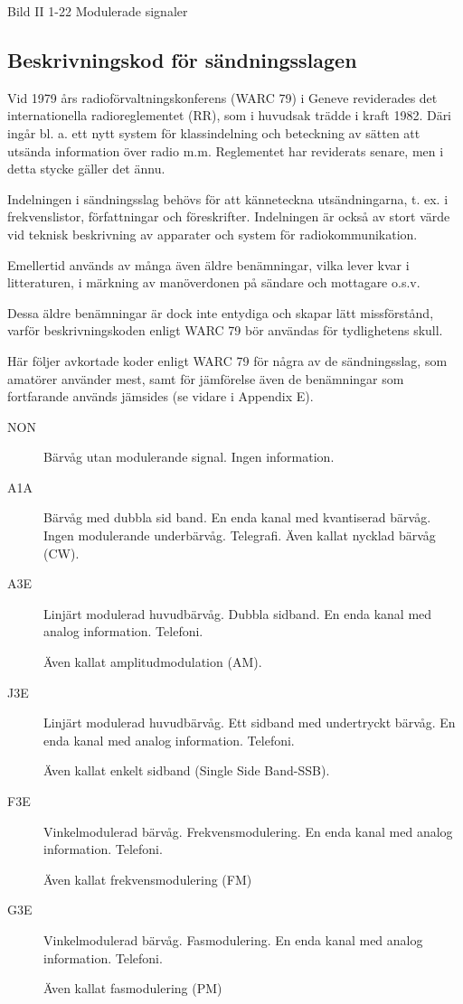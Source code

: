 Bild II 1-22 Modulerade signaler

\subsection{Beskrivningskod för sändningsslagen}

Vid 1979 års radioförvaltningskonferens (WARC 79) i Geneve reviderades det internationella
radioreglementet (RR), som i huvudsak trädde i kraft 1982. Däri ingår bl. a. ett nytt
system för klassindelning och beteckning av sätten att utsända information över
radio m.m. Reglementet har reviderats senare, men i detta stycke gäller det ännu.

Indelningen i sändningsslag behövs för att känneteckna utsändningarna, t. ex. i
frekvenslistor, författningar och föreskrifter. Indelningen är också av stort värde vid
teknisk beskrivning av apparater och system för radiokommunikation.

Emellertid används av många även äldre benämningar, vilka lever kvar i litteraturen, i
märkning av manöverdonen på sändare och mottagare o.s.v.

Dessa äldre benämningar är dock inte entydiga och skapar lätt missförstånd, varför
beskrivningskoden enligt WARC 79 bör användas för tydlighetens skull.

Här följer avkortade koder enligt WARC 79 för några av de sändningsslag, som amatörer
använder mest, samt för jämförelse även de benämningar som fortfarande används jämsides
(se vidare i Appendix E).

\begin{description}
\item[NON] Bärvåg utan modulerande signal. Ingen information.

\item[A1A] Bärvåg med dubbla sid band. En enda kanal med kvantiserad bärvåg. Ingen
modulerande underbärvåg. Telegrafi. Även kallat nycklad bärvåg (CW).

\item[A3E] Linjärt modulerad huvudbärvåg. Dubbla sidband. En enda kanal med
analog information. Telefoni.

Även kallat amplitudmodulation (AM).

\item[J3E] Linjärt modulerad huvudbärvåg. Ett sidband med undertryckt bärvåg. En
enda kanal med analog information. Telefoni.

Även kallat enkelt sidband (Single Side Band-SSB).

\item[F3E] Vinkelmodulerad bärvåg. Frekvensmodulering. En enda kanal med analog
information. Telefoni.

Även kallat frekvensmodulering (FM)

\item[G3E] Vinkelmodulerad bärvåg. Fasmodulering. En enda kanal med analog information.
Telefoni.

Även kallat fasmodulering (PM)
\end{description}


